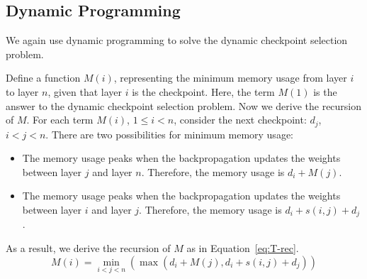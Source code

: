 \subsection{Dynamic Programming}

We again use dynamic programming to solve the dynamic checkpoint selection problem.

Define a function $M(i)$, representing the minimum memory usage from layer $i$ to layer $n$, given that layer $i$ is the checkpoint.
Here, the term $M(1)$ is the answer to the dynamic checkpoint selection problem.
%
Now we derive the recursion of $M$.
For each term $M(i)$, $1\leq i < n$, consider the next checkpoint: $d_j$, $i < j < n$.
There are two possibilities for minimum memory usage:
\begin{itemize}
\item The memory usage peaks when the backpropagation updates the weights between layer $j$ and layer $n$.
Therefore, the memory usage is $d_i + M(j)$.
\item The memory usage peaks when the backpropagation updates the weights between layer $i$ and layer $j$.
Therefore, the memory usage is $d_i + s(i, j) + d_j$.
\end{itemize}
As a result, we derive the recursion of $M$ as in Equation~\ref{eq:T-rec}.
\begin{equation}
M(i) = \min_{i < j < n}(\max(d_i + M(j),  d_i + s(i,j) + d_j)) \label{eq:T-rec}
\end{equation}



